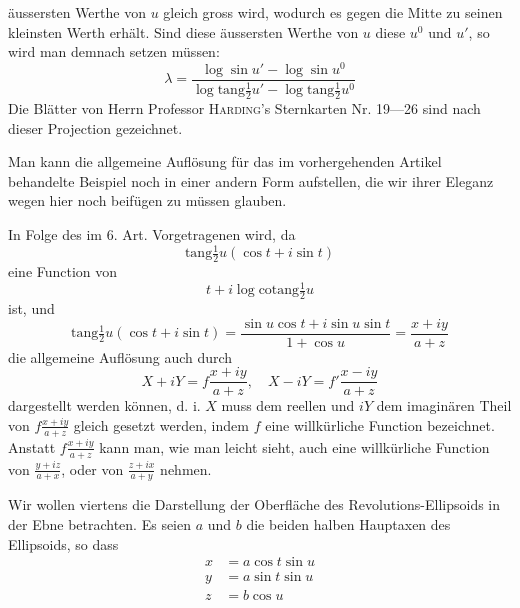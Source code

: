 äussersten Werthe von \(u\) gleich gross wird, wodurch es gegen die Mitte zu seinen kleinsten Werth erhält. Sind diese äussersten Werthe von \(u\) diese \(u^0\) und \(u'\), so wird man demnach setzen müssen:
\[
\lambda=\frac{\log\sin u'-\log\sin u^0}{\log\mathrm{tang}\frac{1}{2}u'-\log\mathrm{tang}\frac{1}{2}u^0}
\]
\noindent Die Blätter von Herrn Professor \textsc{Harding}'s Sternkarten Nr. 19---26 sind nach dieser Projection gezeichnet.

Man kann die allgemeine Auflösung für das im vorhergehenden Artikel behandelte Beispiel noch in einer andern Form aufstellen, die wir ihrer Eleganz wegen hier noch beifügen zu müssen glauben.

In Folge des im 6. Art. Vorgetragenen wird, da
\[
\mathrm{tang}\tfrac{1}{2}u(\cos t+i\sin t)
\]
\noindent eine Function von
\[
t+i\log\mathrm{cotang}\tfrac{1}{2}u
\]
\noindent ist, und
\[
\mathrm{tang}\tfrac{1}{2}u(\cos t+i\sin t)=\frac{\sin u\cos t+i\sin u\sin t}{1+\cos u}=\frac{x+iy}{a+z}
\]
\noindent die allgemeine Auflösung auch durch
\[
X+iY=f\frac{x+iy}{a+z},\quad X-iY=f'\frac{x-iy}{a+z}
\]
\noindent dargestellt werden können, d. i. \(X\) muss dem reellen und \(iY\) dem imaginären Theil von \(f\frac{x+iy}{a+z}\) gleich gesetzt werden, indem \(f\) eine willkürliche Function bezeichnet. Anstatt \(f\frac{x+iy}{a+z}\) kann man, wie man leicht sieht, auch eine willkürliche Function von \(\frac{y+iz}{a+x}\), oder von \(\frac{z+ix}{a+y}\) nehmen.

Wir wollen viertens die Darstellung der Oberfläche des Revolutions-Ellipsoids in der Ebne betrachten. Es seien \(a\) und \(b\) die beiden halben Hauptaxen des Ellipsoids, so dass
\[
\begin{aligned}
x&=a\cos t\sin u\\
y&=a\sin t\sin u\\
z&=b\cos u
\end{aligned}
\]
